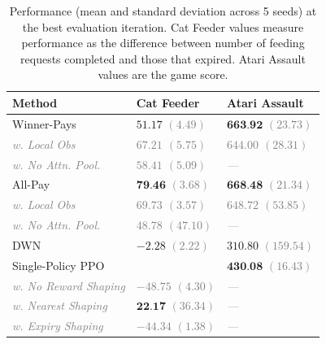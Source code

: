 \begin{table}
  \centering
  \caption{Performance (mean and standard deviation across 5 seeds) at the best evaluation iteration. Cat Feeder values measure performance as the difference between number of feeding requests completed and those that expired. Atari Assault values are the game score.}
  \begin{tabular}{lll}
    \toprule
    {\bf Method} & {\bf Cat Feeder} & {\bf Atari Assault} \\
    \midrule
    Winner-Pays & $51.17$ {\small\textcolor{gray}{$(4.49)$}} & $\textbf{663.92}$ {\small\textcolor{gray}{$(23.73)$}} \\
    \textcolor{gray}{\itshape\hspace{1em}w. Local Obs} & \textcolor{gray}{\itshape $67.21$ {\small$(5.75)$}} & \textcolor{gray}{\itshape $644.00$ {\small$(28.31)$}} \\
    \textcolor{gray}{\itshape\hspace{1em}w. No Attn. Pool.} & \textcolor{gray}{\itshape $58.41$ {\small$(5.09)$}} & \textcolor{gray}{\itshape ---} \\
    All-Pay & $\textbf{79.46}$ {\small\textcolor{gray}{$(3.68)$}} & $\textbf{668.48}$ {\small\textcolor{gray}{$(21.34)$}} \\
    \textcolor{gray}{\itshape\hspace{1em}w. Local Obs} & \textcolor{gray}{\itshape $69.73$ {\small$(3.57)$}} & \textcolor{gray}{\itshape $648.72$ {\small$(53.85)$}} \\
    \textcolor{gray}{\itshape\hspace{1em}w. No Attn. Pool.} & \textcolor{gray}{\itshape $48.78$ {\small$(47.10)$}} & \textcolor{gray}{\itshape ---} \\
    \midrule
    DWN & $-2.28$ {\small\textcolor{gray}{$(2.22)$}} & $310.80$ {\small\textcolor{gray}{$(159.54)$}} \\
    Single-Policy PPO & & $\textbf{430.08}$ {\small\textcolor{gray}{$(16.43)$}} \\
    \textcolor{gray}{\itshape\hspace{1em}w. No Reward Shaping} & \textcolor{gray}{\itshape $-48.75$ {\small$(4.30)$}} & \textcolor{gray}{\itshape ---} \\
    \textcolor{gray}{\itshape\hspace{1em}w. Nearest Shaping} & $\textbf{22.17}$ {\small\textcolor{gray}{$(36.34)$}} & \textcolor{gray}{\itshape ---} \\
    \textcolor{gray}{\itshape\hspace{1em}w. Expiry Shaping} & \textcolor{gray}{\itshape $-44.34$ {\small$(1.38)$}} & \textcolor{gray}{\itshape ---} \\
    \bottomrule
  \end{tabular}
  \label{tab:all_methods_comp}
\end{table}
